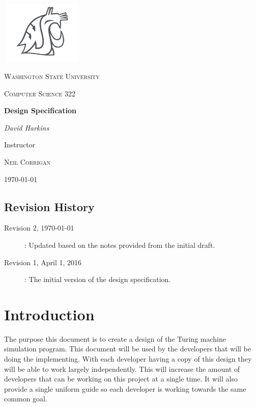 \documentclass{report}
\begin{document}
 
 \begin{titlepage}
	\centering
    \includegraphics[width=4cm, height=3cm]{head-white-gray-big.png}

	{\scshape\LARGE Washington State University \par}
	\vspace{1cm}
	{\scshape\Large Computer Science 322\par}
	\vspace{1.5cm}
	{\huge\bfseries Design Specification\par}
	\vspace{2cm}
	{\Large\itshape David Harkins\par}
	\vfill
	Instructor\par
	\textsc{Neil Corrigan}

	\vfill
	{\large \today\par}
\end{titlepage}
\pagebreak
 
\tableofcontents{}
\pagebreak

\listoffigures

\section*{Revision History}

\begin{description}
\item[Revision 2, \today]: Updated based on the notes provided from the initial draft.
\item[Revision 1, April 1, 2016]: The initial version of the design specification.
\end{description} 
\pagebreak

\chapter{Introduction}
 	The purpose this document is to create a design of the Turing machine simulation program. This document will be used by the developers that will be doing the implementing. With each developer having a copy of this design they will be able to work largely independently. This will increase the amount of developers that can be working on this project at a single time. It will also provide a single uniform guide so each developer is working towards the same common goal.
    
\end{document}
